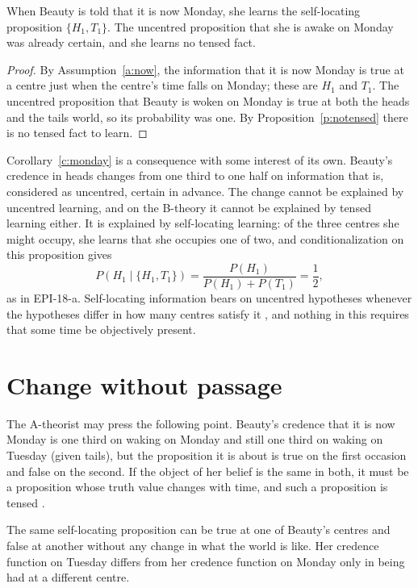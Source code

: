 \documentclass{situationist-preprint}
\begin{document}
\begin{corollary}\label{c:monday}
When Beauty is told that it is now Monday, she learns the self-locating proposition $\{H_1, T_1\}$. The uncentred proposition that she is awake on Monday was already certain, and she learns no tensed fact.
\end{corollary}

\begin{proof}
By Assumption~\ref{a:now}, the information that it is now Monday is true at a centre just when the centre's time falls on Monday; these are $H_1$ and $T_1$. The uncentred proposition that Beauty is woken on Monday is true at both the heads and the tails world, so its probability was one. By Proposition~\ref{p:notensed} there is no tensed fact to learn.
\end{proof}

Corollary~\ref{c:monday} is a consequence with some interest of its own. Beauty's credence in heads changes from one third to one half on information that is, considered as uncentred, certain in advance. The change cannot be explained by uncentred learning, and on the B-theory it cannot be explained by tensed learning either. It is explained by self-locating learning: of the three centres she might occupy, she learns that she occupies one of two, and conditionalization on this proposition gives
\[
P(H_1 \mid \{H_1, T_1\}) = \frac{P(H_1)}{P(H_1) + P(T_1)} = \frac{1}{2},
\]
as in EPI-18-a. Self-locating information bears on uncentred hypotheses whenever the hypotheses differ in how many centres satisfy it \citep{Elga2004}, and nothing in this requires that some time be objectively present.

\section{Change without passage}

The A-theorist may press the following point. Beauty's credence that it is now Monday is one third on waking on Monday and still one third on waking on Tuesday (given tails), but the proposition it is about is true on the first occasion and false on the second. If the object of her belief is the same in both, it must be a proposition whose truth value changes with time, and such a proposition is tensed \citep{Prior1959}.

\begin{proposition}\label{p:shift}
The same self-locating proposition can be true at one of Beauty's centres and false at another without any change in what the world is like. Her credence function on Tuesday differs from her credence function on Monday only in being had at a different centre.
\end{proposition}
\end{document}

